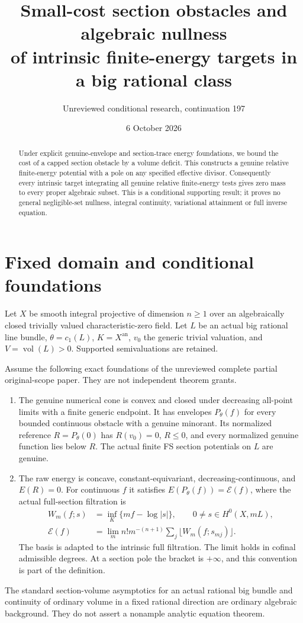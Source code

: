 \documentclass[11pt]{article}
\title{Small-cost section obstacles and algebraic nullness\protect\\
of intrinsic finite-energy targets in a big rational class}
\author{Unreviewed conditional research, continuation 197}
\date{6 October 2026}
\newcommand{\vol}{\operatorname{vol}}
\begin{document}
\maketitle
\begin{abstract}
Under explicit genuine-envelope and section-trace energy foundations,
we bound the cost of a capped section obstacle by a volume deficit.
This constructs a genuine relative finite-energy potential with a pole
on any specified effective divisor. Consequently every intrinsic target
integrating all genuine relative finite-energy tests gives zero mass
to every proper algebraic subset. This is a conditional supporting
result; it proves no general negligible-set nullness, integral
continuity, variational attainment or full inverse equation.
\end{abstract}

\section{Fixed domain and conditional foundations}
Let $X$ be smooth integral projective of dimension $n\geq1$ over an
algebraically closed trivially valued characteristic-zero field.
Let $L$ be an actual big rational line bundle, $\theta=c_1(L)$,
$K=X^{\mathrm{an}}$, $v_0$ the generic trivial valuation, and
$V=\vol(L)>0$. Supported semivaluations are retained.

Assume the following exact foundations of the unreviewed complete
partial original-scope paper. They are not independent theorem grants.
\begin{enumerate}
\item The genuine numerical cone is convex and closed under
decreasing all-point limits with a finite generic endpoint. It has
envelopes $P_\theta(f)$ for every bounded continuous obstacle with a
genuine minorant. Its normalized reference $R=P_\theta(0)$ has
$R(v_0)=0$, $R\leq0$, and every normalized genuine function lies below $R$.
The actual finite FS section potentials on $L$ are genuine.
\item The raw energy is concave, constant-equivariant,
decreasing-continuous, and $E(R)=0$. For continuous $f$ it satisfies
$E(P_\theta(f))=\mathscr E(f)$, where the actual full-section filtration is
\begin{align*}
 W_m(f;s)&=\inf_K\{mf-\log|s|\},\qquad0\neq s\in H^0(X,mL),\\
 \mathscr E(f)&=\lim_m n!m^{-(n+1)}
                  \sum_j\lfloor W_m(f;s_{mj})\rfloor.
\end{align*}
The basis is adapted to the intrinsic full filtration. The limit holds
in cofinal admissible degrees. At a section pole the bracket is
$+\infty$, and this convention is part of the definition.
\end{enumerate}
The standard section-volume asymptotics for an actual rational big
bundle and continuity of ordinary volume in a fixed rational direction
are ordinary algebraic background. They do not assert a nonample
analytic equation theorem.
\end{document}
